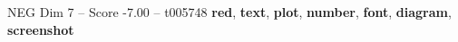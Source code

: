 \begin{textsample}{NEG Dim 7 – Score -7.00 – t005748}  \label{ex:f7_neg_022}
\textbf{red}, \textbf{text}, \textbf{plot}, \textbf{number}, \textbf{font}, \textbf{diagram}, \textbf{screenshot}

\end{textsample}
